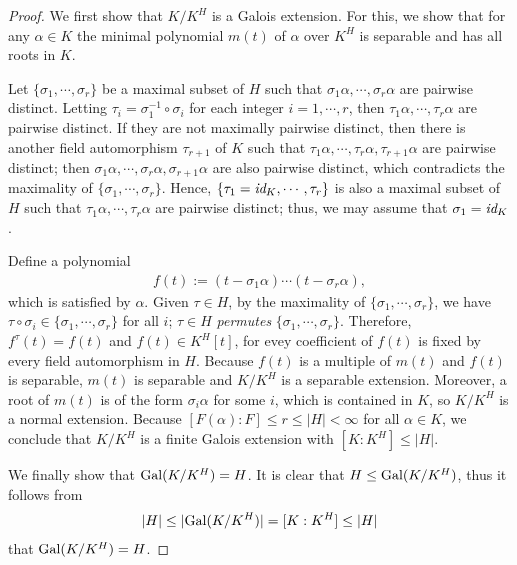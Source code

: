 \begin{proof}
    We first show that $K/K^H$ is a Galois extension.
    For this, we show that for any $\alpha\in K$ the minimal polynomial $m(t)$ of $\alpha$ over $K^H$ is separable and has all roots in $K$.
    
    \color{magenta}Let $\{\sigma_1, \cdots, \sigma_r\}$ be a maximal subset of $H$ such that $\sigma_1\alpha, \cdots, \sigma_r\alpha$ are pairwise distinct. \color{black}
    Letting $\tau_i=\sigma_1^{-1}\circ\sigma_i$ for each integer $i=1, \cdots, r$, then $\tau_1\alpha, \cdots, \tau_r\alpha$ are pairwise distinct.
    If they are not maximally pairwise distinct, then there is another field automorphism $\tau_{r+1}$ of $K$ such that $\tau_1\alpha, \cdots, \tau_r\alpha, \tau_{r+1}\alpha$ are pairwise distinct; then $\sigma_1\alpha, \cdots, \sigma_r\alpha, \sigma_{r+1}\alpha$ are also pairwise distinct, which contradicts the maximality of $\{\sigma_1, \cdots, \sigma_r\}$.
    Hence, $\{\tau_1=\textit{id}_{K}, \cdots, \tau_r\}$ is also a maximal subset of $H$ such that $\tau_1\alpha, \cdots, \tau_r\alpha$ are pairwise distinct; thus, we may assume that $\sigma_1=\textit{id}_{K}$.

    Define a polynomial
    \begin{align*}
        f(t):=(t-\sigma_1\alpha)\cdots(t-\sigma_r\alpha),
    \end{align*}
    which is satisfied by $\alpha$.
    Given $\tau\in H$, by the maximality of $\{\sigma_1, \cdots, \sigma_r\}$, we have $\tau\circ\sigma_i\in\{\sigma_1, \cdots, \sigma_r\}$ for all $i$; $\tau\in H$ \textit{permutes} $\{\sigma_1, \cdots, \sigma_r\}$.
    Therefore, $f^\tau(t)=f(t)$ and $f(t)\in K^H[t]$, for evey coefficient of $f(t)$ is fixed by every field automorphism in $H$.
    Because $f(t)$ is a multiple of $m(t)$ and $f(t)$ is separable, $m(t)$ is separable and $K/K^H$ is a separable extension.
    Moreover, a root of $m(t)$ is of the form $\sigma_i\alpha$ for some $i$, which is contained in $K$, so $K/K^H$ is a normal extension.
    Because $[F(\alpha): F]\leq r\leq |H|<\infty$ for all $\alpha\in K$, we conclude that $K/K^H$ is a finite Galois extension with $[K:K^H]\leq |H|$.

    We finally show that ${\textrm{Gal}({K/K^H})}=H$.
    It is clear that $H\leq{\textrm{Gal}({K/K^H})}$, thus it follows from
    \begin{align*}
        |H|\leq|{\textrm{Gal}({K/K^H})}|=[K:K^H]\leq|H|
    \end{align*}
    that ${\textrm{Gal}({K/K^H})}=H$.
\end{proof}